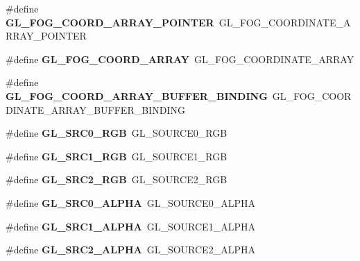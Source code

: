 \begin{DoxyCompactItemize}
\item 
\#define {\bfseries G\+L\+\_\+\+F\+O\+G\+\_\+\+C\+O\+O\+R\+D\+\_\+\+A\+R\+R\+A\+Y\+\_\+\+P\+O\+I\+N\+T\+E\+R}~G\+L\+\_\+\+F\+O\+G\+\_\+\+C\+O\+O\+R\+D\+I\+N\+A\+T\+E\+\_\+\+A\+R\+R\+A\+Y\+\_\+\+P\+O\+I\+N\+T\+E\+R\label{_s_d_l__opengl_8h_a80ead4fe1d89080d7f830e9dd1fd8871}

\item 
\#define {\bfseries G\+L\+\_\+\+F\+O\+G\+\_\+\+C\+O\+O\+R\+D\+\_\+\+A\+R\+R\+A\+Y}~G\+L\+\_\+\+F\+O\+G\+\_\+\+C\+O\+O\+R\+D\+I\+N\+A\+T\+E\+\_\+\+A\+R\+R\+A\+Y\label{_s_d_l__opengl_8h_a1d2616b400f9ea5d82f5ce6dfd2e53b5}

\item 
\#define {\bfseries G\+L\+\_\+\+F\+O\+G\+\_\+\+C\+O\+O\+R\+D\+\_\+\+A\+R\+R\+A\+Y\+\_\+\+B\+U\+F\+F\+E\+R\+\_\+\+B\+I\+N\+D\+I\+N\+G}~G\+L\+\_\+\+F\+O\+G\+\_\+\+C\+O\+O\+R\+D\+I\+N\+A\+T\+E\+\_\+\+A\+R\+R\+A\+Y\+\_\+\+B\+U\+F\+F\+E\+R\+\_\+\+B\+I\+N\+D\+I\+N\+G\label{_s_d_l__opengl_8h_acf2ea0fb7bfbb4a5d030d987d88407d1}

\item 
\#define {\bfseries G\+L\+\_\+\+S\+R\+C0\+\_\+\+R\+G\+B}~G\+L\+\_\+\+S\+O\+U\+R\+C\+E0\+\_\+\+R\+G\+B\label{_s_d_l__opengl_8h_a1631beb4d4744c2dbb985bd6d3d1964c}

\item 
\#define {\bfseries G\+L\+\_\+\+S\+R\+C1\+\_\+\+R\+G\+B}~G\+L\+\_\+\+S\+O\+U\+R\+C\+E1\+\_\+\+R\+G\+B\label{_s_d_l__opengl_8h_a3f37dbd949df78380b1ad8ba1cb84ee6}

\item 
\#define {\bfseries G\+L\+\_\+\+S\+R\+C2\+\_\+\+R\+G\+B}~G\+L\+\_\+\+S\+O\+U\+R\+C\+E2\+\_\+\+R\+G\+B\label{_s_d_l__opengl_8h_a3d502987f54308264b36939a4d2bb3e2}

\item 
\#define {\bfseries G\+L\+\_\+\+S\+R\+C0\+\_\+\+A\+L\+P\+H\+A}~G\+L\+\_\+\+S\+O\+U\+R\+C\+E0\+\_\+\+A\+L\+P\+H\+A\label{_s_d_l__opengl_8h_abdf71dbfa895309419063f5ed71833e8}

\item 
\#define {\bfseries G\+L\+\_\+\+S\+R\+C1\+\_\+\+A\+L\+P\+H\+A}~G\+L\+\_\+\+S\+O\+U\+R\+C\+E1\+\_\+\+A\+L\+P\+H\+A\label{_s_d_l__opengl_8h_a35a28830b374907100ab8886c885bbaa}

\item 
\#define {\bfseries G\+L\+\_\+\+S\+R\+C2\+\_\+\+A\+L\+P\+H\+A}~G\+L\+\_\+\+S\+O\+U\+R\+C\+E2\+\_\+\+A\+L\+P\+H\+A\label{_s_d_l__opengl_8h_af399fc8aedb7069dda597b490b18fa1c}


\end{DoxyCompactItemize}
